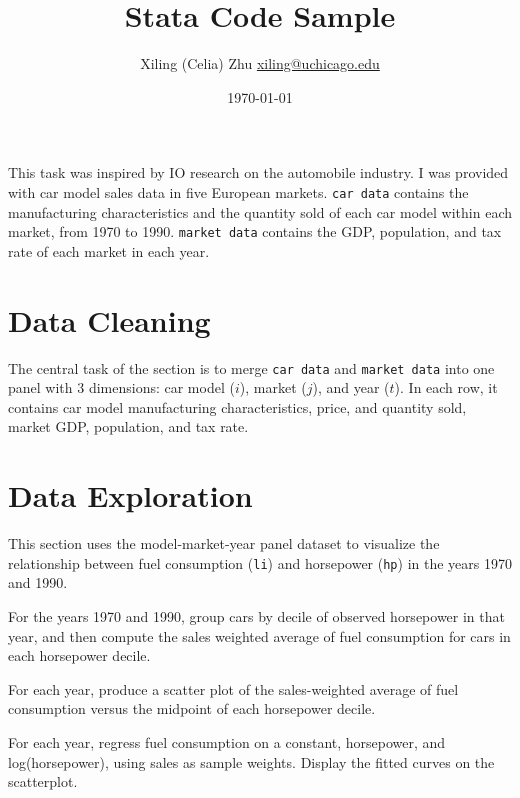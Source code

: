 \documentclass[12pt]{article}
\begin{document}
\title{Stata Code Sample}
\author{Xiling (Celia) Zhu \href{mailto:xiling@uchicago.edu}{xiling@uchicago.edu} }
\date{\today}
\maketitle

\setcounter{page}{1}

This task was inspired by IO research on the automobile industry. I was provided with car model sales data in five European markets. \texttt{car\ data} contains the manufacturing characteristics and the quantity sold of each car model within each market, from 1970 to 1990. \texttt{market\ data} contains the GDP, population, and tax rate of each market in each year.

\section{Data Cleaning}\label{data-cleaning}

The central task of the section is to merge \texttt{car\ data} and \texttt{market\ data} into one panel with 3 dimensions: car model ($i$), market ($j$), and year ($t$). In each row, it contains car model manufacturing characteristics, price, and quantity sold, market GDP, population, and tax rate.

\section{Data Exploration}\label{data-exploration}

This section uses the model-market-year panel dataset to visualize the relationship between fuel consumption (\texttt{li}) and horsepower (\texttt{hp}) in the years 1970 and 1990.

For the years 1970 and 1990, group cars by decile of observed horsepower in that year, and then compute the sales weighted average of fuel consumption for cars in each horsepower decile.

For each year, produce a scatter plot of the sales-weighted average of fuel consumption versus the midpoint of each horsepower decile.

For each year, regress fuel consumption on a constant, horsepower, and log(horsepower), using sales as sample weights. Display the fitted curves on the scatterplot.
\end{document}
